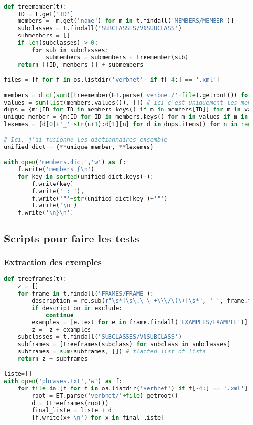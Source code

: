 \begin{lstlisting}[language=Python, caption = code pour ajouter des lexèmes à lexicon.dict]

def treemember(t):
    ID = t.get('ID')
    members = [m.get('name') for m in t.findall('MEMBERS/MEMBER')]
    subclasses = t.findall('SUBCLASSES/VNSUBCLASS')
    submembers = []
    if len(subclasses) > 0:
        for sub in subclasses:
            submembers = submembers + treemember(sub)
    return [(ID, members )] + submembers

files = [f for f in os.listdir('verbnet') if f[-4:] == '.xml']

members = dict(sum([treemember(ET.parse('verbnet/'+file).getroot()) for file in files], [])) # ici on a classe : [membre,...]
values = sum(list(members.values()), []) # ici c'est uniquement les membres, sans infos sur leur classe
dups = {m:[ID for ID in members.keys() if m in members[ID]] for m in values if values.count(m)>1}
unique_member = {m:ID for ID in members.keys() for m in values if m in members[ID] and values.count(m)==1}
lexemes = {d[0]+'_'+str(n+1):d[1][n] for d in dups.items() for n in range(len(d[1]))}

# Ici, j'ai fusionne les dictionnaires ensemble
unified_dict = {**unique_member, **lexemes}

with open('members.dict','w') as f:
    f.write('members {\n')
    for key in sorted(unified_dict.keys()):
        f.write(key)
        f.write(' : '),
        f.write('"'+str(unified_dict[key])+'"')
        f.write('\n')
    f.write('\n}\n')

\end{lstlisting}


\subsection{Scripts pour faire les tests}

\subsubsection{Extraction des exemples}

\begin{lstlisting}[language=Python, caption = code pour créer phrases.txt]
def treeframes(t):
    z = []
    for frame in t.findall('FRAMES/FRAME'):
        description = re.sub(r"\s*[\s\.\-\ +\\\/\(\)]\s*", '_', frame.find('DESCRIPTION').get('primary'))
        if description in exclude:
            continue    
        examples = [e.text for e in frame.findall('EXAMPLES/EXAMPLE')]
        z =  z + examples 
    subclasses = t.findall('SUBCLASSES/VNSUBCLASS')
    subframes = [treeframes(subclass) for subclass in subclasses]
    subframes = sum(subframes, []) # flatten list of lists
    return z + subframes

liste=[]
with open('phrases.txt','w') as f:
    for file in [f for f in os.listdir('verbnet') if f[-4:] == '.xml']:
        root = ET.parse('verbnet/'+file).getroot()       
        d = (treeframes(root))
        final_liste = liste + d
        [f.write(x+'\n') for x in final_liste]

\end{lstlisting}

